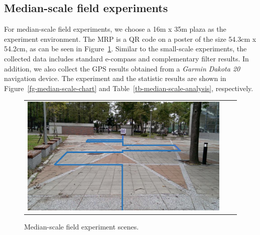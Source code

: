 \subsection{Median-scale field experiments}
For median-scale field experiments, we choose a 16m x 35m plaza as the experiment environment. The MRP is a QR code on a poster of the size 54.3cm x 54.2cm, as can be seen in Figure~\ref{fg-median-scale-scenes}. Similar to the small-scale experiments, the collected data includes standard e-compass and complementary filter results. In addition, we also collect the GPS results obtained from a \emph{Garmin Dakota 20} navigation device. The experiment and the statistic results are shown in Figure~\ref{fg-median-scale-chart} and Table~\ref{tb-median-scale-analysis}, respectively.\\
\begin{figure}[th!]
\begin{center}
 \begin{tabular}[t]{ccc}
    \begin{minipage}[t]{0.5\textwidth}
      \includegraphics[width=\textwidth]{fig/median-scale-scenes.eps}
      \caption{Median-scale field experiment scenes.}\label{fg-median-scale-scenes}
    \end{minipage}
    \quad \quad
    \begin{minipage}[t]{0.3\textwidth}

\end{minipage}
\end{tabular}
\end{center}
\end{figure}
